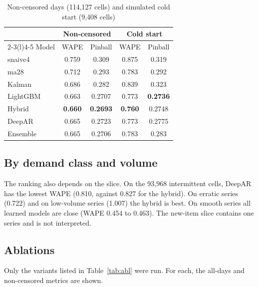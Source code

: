 \documentclass[conference]{IEEEtran}
\begin{document}
\begin{table}[t]
\caption{Non-censored days (114,127 cells) and simulated cold start (9,408 cells)}
\label{tab:slices}
\centering
\small
\begin{tabular}{@{}lcccc@{}}
\toprule
& \multicolumn{2}{c}{Non-censored} & \multicolumn{2}{c}{Cold start}\\
\cmidrule(lr){2-3}\cmidrule(l){4-5}
Model & WAPE & Pinball & WAPE & Pinball\\
\midrule
\textsf{snaive4} & 0.759 & 0.309 & 0.875 & 0.319\\
\textsf{ma28} & 0.712 & 0.293 & 0.783 & 0.292\\
Kalman & 0.686 & 0.282 & 0.839 & 0.323\\
LightGBM & 0.663 & 0.2707 & 0.773 & \textbf{0.2736}\\
Hybrid & \textbf{0.660} & \textbf{0.2693} & \textbf{0.760} & 0.2748\\
DeepAR & 0.665 & 0.2723 & 0.773 & 0.2775\\
Ensemble & 0.665 & 0.2706 & 0.783 & 0.283\\
\bottomrule
\end{tabular}
\end{table}

\subsection{By demand class and volume}
The ranking also depends on the slice. On the 93,968 intermittent cells, DeepAR has the lowest WAPE (0.810, against 0.827 for the hybrid). On erratic series (0.722) and on low-volume series (1.007) the hybrid is best. On smooth series all learned models are close (WAPE 0.454 to 0.463). The new-item slice contains one series and is not interpreted.

\subsection{Ablations}\label{sec:abl}
Only the variants listed in Table~\ref{tab:abl} were run. For each, the all-days and non-censored metrics are shown.
\end{document}
